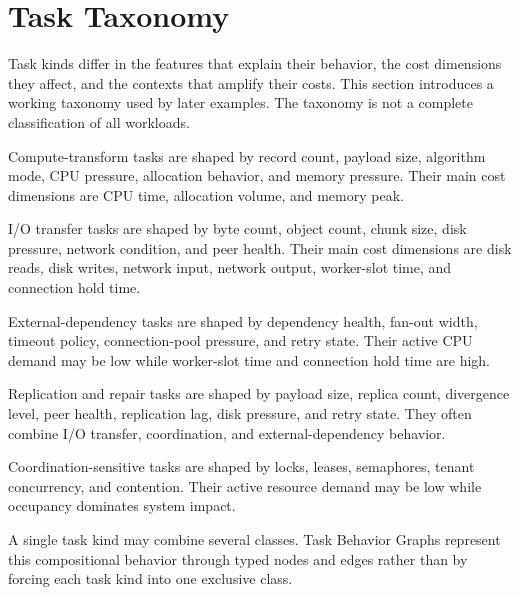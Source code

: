 \section{Task Taxonomy}
\label{sec:task-taxonomy}

Task kinds differ in the features that explain their behavior, the cost
dimensions they affect, and the contexts that amplify their costs. This section
introduces a working taxonomy used by later examples. The taxonomy is not a
complete classification of all workloads.

Compute-transform tasks are shaped by record count, payload size, algorithm
mode, CPU pressure, allocation behavior, and memory pressure. Their main cost
dimensions are CPU time, allocation volume, and memory peak.

I/O transfer tasks are shaped by byte count, object count, chunk size, disk
pressure, network condition, and peer health. Their main cost dimensions are
disk reads, disk writes, network input, network output, worker-slot time, and
connection hold time.

External-dependency tasks are shaped by dependency health, fan-out width,
timeout policy, connection-pool pressure, and retry state. Their active CPU
demand may be low while worker-slot time and connection hold time are high.

Replication and repair tasks are shaped by payload size, replica count,
divergence level, peer health, replication lag, disk pressure, and retry state.
They often combine I/O transfer, coordination, and external-dependency behavior.

Coordination-sensitive tasks are shaped by locks, leases, semaphores, tenant
concurrency, and contention. Their active resource demand may be low while
occupancy dominates system impact.

A single task kind may combine several classes. Task Behavior Graphs represent
this compositional behavior through typed nodes and edges rather than by forcing
each task kind into one exclusive class.
